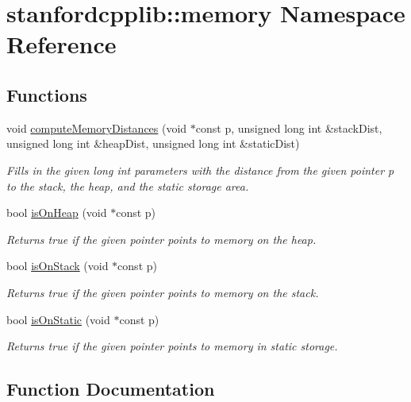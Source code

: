 \hypertarget{namespacestanfordcpplib_1_1memory}{}\section{stanfordcpplib\+:\+:memory Namespace Reference}
\label{namespacestanfordcpplib_1_1memory}
\subsection*{Functions}
\begin{DoxyCompactItemize}
\item 
void \mbox{\hyperlink{namespacestanfordcpplib_1_1memory_a448abf0281e0513a88cfd382c4df3449}{compute\+Memory\+Distances}} (void $\ast$const p, unsigned long int \&stack\+Dist, unsigned long int \&heap\+Dist, unsigned long int \&static\+Dist)
\begin{DoxyCompactList}\small\item\em Fills in the given long int parameters with the distance from the given pointer p to the stack, the heap, and the static storage area. \end{DoxyCompactList}\item 
bool \mbox{\hyperlink{namespacestanfordcpplib_1_1memory_a53377d7db90f7deaa0eac5ff80a65d81}{is\+On\+Heap}} (void $\ast$const p)
\begin{DoxyCompactList}\small\item\em Returns true if the given pointer points to memory on the heap. \end{DoxyCompactList}\item 
bool \mbox{\hyperlink{namespacestanfordcpplib_1_1memory_aa1e188da9820e354f8818938e9eae213}{is\+On\+Stack}} (void $\ast$const p)
\begin{DoxyCompactList}\small\item\em Returns true if the given pointer points to memory on the stack. \end{DoxyCompactList}\item 
bool \mbox{\hyperlink{namespacestanfordcpplib_1_1memory_a9ab578894aae2eb9ce5cc01058ab2a20}{is\+On\+Static}} (void $\ast$const p)
\begin{DoxyCompactList}\small\item\em Returns true if the given pointer points to memory in static storage. \end{DoxyCompactList}\end{DoxyCompactItemize}


\subsection{Function Documentation}
\mbox{\label{namespacestanfordcpplib_1_1memory_a448abf0281e0513a88cfd382c4df3449}} 
